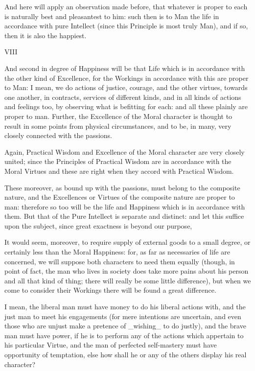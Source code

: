 And here will apply an observation made before, that whatever is proper
to each is naturally best and pleasantest to him: such then is to Man
the life in accordance with pure Intellect (since this Principle is most
truly Man), and if so, then it is also the happiest.


VIII

And second in degree of Happiness will be that Life which is in
accordance with the other kind of Excellence, for the Workings in
accordance with this are proper to Man: I mean, we do actions of
justice, courage, and the other virtues, towards one another, in
contracts, services of different kinds, and in all kinds of actions and
feelings too, by observing what is befitting for each: and all these
plainly are proper to man. Further, the Excellence of the Moral
character is thought to result in some points from physical
circumstances, and to be, in many, very closely connected with the
passions.

Again, Practical Wisdom and Excellence of the Moral character are
very closely united; since the Principles of Practical Wisdom are in
accordance with the Moral Virtues and these are right when they accord
with Practical Wisdom.

These moreover, as bound up with the passions, must belong to the
composite nature, and the Excellences or Virtues of the composite nature
are proper to man: therefore so too will be the life and Happiness which
is in accordance with them. But that of the Pure Intellect is separate
and distinct: and let this suffice upon the subject, since great
exactness is beyond our purpose,

It would seem, moreover, to require supply of external goods to a small
degree, or certainly less than the Moral Happiness: for, as far as
necessaries of life are concerned, we will suppose both characters to
need them equally (though, in point of fact, the man who lives in
society does take more pains about his person and all that kind of
thing; there will really be some little difference), but when we come to
consider their Workings there will be found a great difference.

I mean, the liberal man must have money to do his liberal actions with,
and the just man to meet his engagements (for mere intentions
are uncertain, and even those who are unjust make a pretence of
_wishing_ to do justly), and the brave man must have power, if
he is to perform any of the actions which appertain to his particular
Virtue, and the man of perfected self-mastery must have opportunity of
temptation, else how shall he or any of the others display his real
character?

